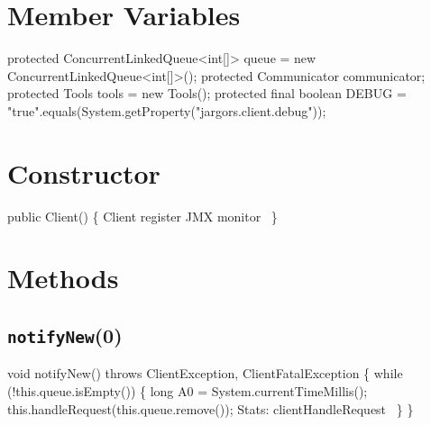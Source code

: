 \section{Member Variables}
\nwenddocs{}\plusendmoddef
protected ConcurrentLinkedQueue<int[]> queue = new ConcurrentLinkedQueue<int[]>();
protected Communicator communicator;
protected Tools tools = new Tools();
protected final boolean DEBUG =
    "true".equals(System.getProperty("jargors.client.debug"));
\nwendcode{}\nwdocspar
\section{Constructor}
\nwenddocs{}\endmoddef{}
public Client() \{
  \LA{}\code{}Client\edoc{} register JMX monitor~{\nwtagstyle{}}\RA{}
\}
\nwendcode{}\nwdocspar

\section{Methods}

\subsection{\texttt{notifyNew}(0)}
\nwenddocs{}\endmoddef{}
void notifyNew() throws ClientException, ClientFatalException \{
  while (!this.queue.isEmpty()) \{
    long A0 = System.currentTimeMillis();
    this.handleRequest(this.queue.remove());
    \LA{}Stats: clientHandleRequest~{\nwtagstyle{}}\RA{}
  \}
\}
\eatline
{}\nwendcode{}\nwdocspar
